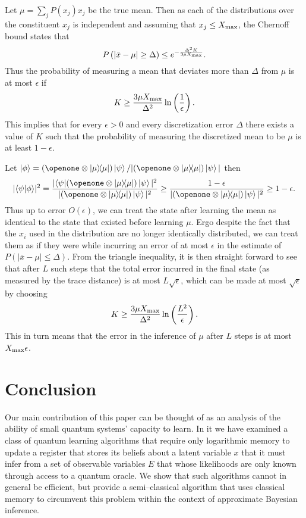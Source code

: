 \documentclass[aps,amsmath,onecolumn,amssymb]{revtex4}
\begin{document}
Let $\mu= \sum_j P(x_j) x_j$ be the true mean.  Then as each of the distributions over the constituent $x_j$ is independent and assuming that $x_j \le X_{\rm max}$, the Chernoff bound states that
\begin{equation}
P\left(\left|\bar{x} - \mu\right|\ge \Delta \right)\le e^{-\frac{\Delta^2 K}{3\mu X_{\rm max}}}.
\end{equation}
Thus the probability of measuring a mean that deviates more than $\Delta$ from $\mu$ is at most $\epsilon$ if
\begin{equation}
K\ge \frac{3\mu X_{\rm max}}{\Delta^2}\ln\left(\frac{1}{\epsilon} \right).
\end{equation}
This implies that for every $\epsilon>0$ and every discretization error $\Delta$ there exists a value of $K$ such that the probability of measuring the discretized mean to be $\mu$ is at least $1-\epsilon$.

Let $\ket{\phi} = (\openone \otimes \ketbra{\mu}{\mu}) \ket{\psi} / |(\openone \otimes \ketbra{\mu}{\mu}) \ket{\psi}|$ then
\begin{equation}
|\braket{\psi}{\phi}|^2 = \frac{|\bra{\psi} (\openone \otimes \ketbra{\mu}{\mu}) \ket{\psi}|^2}{|(\openone \otimes \ketbra{\mu}{\mu}) \ket{\psi}|^2} \ge \frac{1-\epsilon}{|(\openone \otimes \ketbra{\mu}{\mu}) \ket{\psi}|^2} \ge 1-\epsilon.
\end{equation}
Thus up to error $O(\epsilon)$, we can treat the state after learning the mean as identical to the state that existed before learning $\mu$.  Ergo despite the fact that the $x_i$ used in the distribution are no longer identically distributed, we can treat them as if they were while incurring an error of at most $\epsilon$ in the estimate of $P(|\bar{x} - \mu|\le \Delta)$.  
From the triangle inequality, it is then straight forward to see that after $L$ such steps that the total error incurred in the final state (as measured by the trace distance) is at most $L\sqrt{\epsilon}$, which can be made at most $\sqrt{\epsilon}$ by choosing 
\begin{equation}
K\ge \frac{3\mu X_{\rm max}}{\Delta^2}\ln\left(\frac{L^2}{\epsilon} \right).
\end{equation}
This in turn means that the error in the inference of $\mu$ after $L$ steps is at most $X_{\rm max} \epsilon$.


\section{Conclusion}
Our main contribution of this paper can be thought of as an analysis of the ability of small quantum systems' capacity to learn.  In it we have examined a class of quantum learning algorithms that require only logarithmic memory to update a register that stores its beliefs about a latent variable $x$ that it must infer from a set of observable variables $E$ that whose likelihoods are only known through access to a quantum oracle.  We show that such algorithms cannot in general be efficient, but provide a semi--classical algorithm that uses classical memory to circumvent this problem within the context of approximate Bayesian inference.
\end{document}
